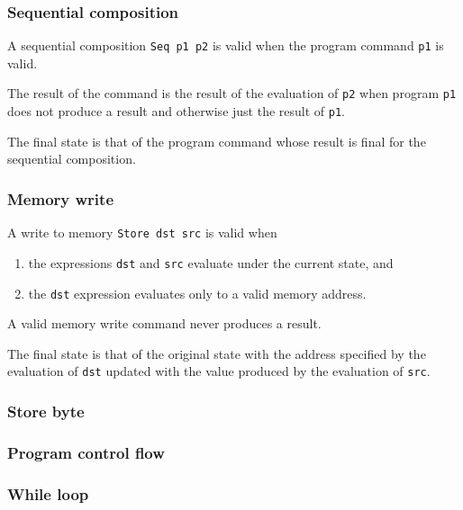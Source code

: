 \documentclass[a4paper]{amsbook}
\begin{document}
\subsubsection{Sequential composition}
\label{sec:sequ-comp}

A sequential composition \lstinline!Seq p1 p2! is valid when the program command \lstinline!p1! is valid.

The result of the command is the result of the evaluation of \lstinline!p2! when program \lstinline!p1! does not produce a result and otherwise just the result of \lstinline!p1!.

The final state is that of the program command whose result is final for the sequential composition.

\subsubsection{Memory write}
\label{sec:memory-write}

A write to memory \lstinline!Store dst src! is valid when
\begin{enumerate}
  \item the expressions \lstinline!dst! and \lstinline!src! evaluate under the current state, and
  \item the \lstinline!dst! expression evaluates only to a valid memory address.
\end{enumerate}

A valid memory write command never produces a result.

The final state is that of the original state with the address specified by the evaluation of \lstinline!dst! updated with the value produced by the evaluation of \lstinline!src!.


\subsubsection{Store byte}
\label{sec:store-byte}

\subsubsection{Program control flow}
\label{sec:program-control-flow}

\subsubsection{While loop}
\label{sec:while-loop}
\end{document}
